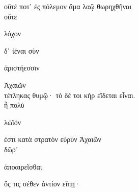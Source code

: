 \documentclass{ransom}
\begin{document}
\begin{foreignpage}
\begin{graytext}
οὔτέ ποτ᾽ ἐς πόλεμον ἅμα λαῷ θωρηχθῆναι\\
οὔτε \begin{whitetext}λόχον\end{whitetext} δ᾽ ἰέναι σὺν \begin{whitetext}ἀριστήεσσιν\end{whitetext} Ἀχαιῶν\\
τέτληκας θυμῷ· τὸ δέ τοι κὴρ εἴδεται εἶναι.\\
ἦ πολὺ \begin{whitetext}λώϊόν\end{whitetext} ἐστι κατὰ στρατὸν εὐρὺν Ἀχαιῶν\\
δῶρ᾽ \begin{whitetext}ἀποαιρεῖσθαι\end{whitetext} ὅς τις σέθεν ἀντίον εἴπῃ·\hfill{}\\

\end{graytext}


\end{foreignpage}
\end{document}
